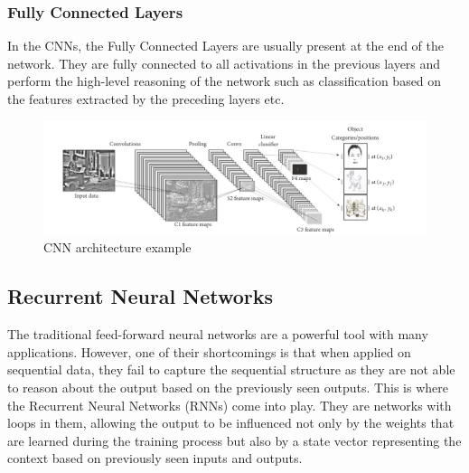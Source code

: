 \subsubsection{Fully Connected Layers}
In the CNNs, the Fully Connected Layers are usually present at the end of the network. They are fully connected to all activations in the previous layers and perform the high-level reasoning of the network such as classification based on the features extracted by the preceding layers etc.

\begin{figure}[h!]
    \centering
    \includegraphics[scale=0.3]{figures/CNN_example.png}
    \caption{CNN architecture example \cite{DL_for_computer_Vision}}
    \label{fig:DL}
\end{figure}

\subsection{Recurrent Neural Networks}\label{tb:rnn}
The traditional feed-forward neural networks are a powerful tool with many applications. However, one of their shortcomings is that when applied on sequential data, they fail to capture the sequential structure as they are not able to reason about the output based on the previously seen outputs. This is where the Recurrent Neural Networks (RNNs) come into play. They are networks with loops in them, allowing the output to be influenced not only by the weights that are learned during the training process but also by a state vector representing the context based on previously seen inputs and outputs.

